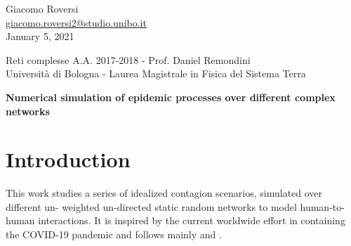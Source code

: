 \documentclass[DIV=12, BCOR=0pt]{scrartcl}  %
\begin{document}
%	
%



\begin{flushright}
	{\large Giacomo Roversi} \\ 
	{\small \href{mailto:giacomo.roversi2@studio.unibo.it}{giacomo.roversi2@studio.unibo.it} }\\
	\vskip0.15in
	{\large January 5, 2021}
\end{flushright}

\begin{flushleft}
	{\Large \color{gray}
		Reti complesse A.A. 2017-2018 - Prof. Daniel Remondini  \\
		Università di Bologna - Laurea Magistrale in Fisica del Sistema Terra}


	\vskip0.2in
	{\huge\textbf{Numerical simulation of epidemic processes over different complex networks}} 
	\vskip0.33in
	
\end{flushleft}
	
	\section*{Introduction}
	\label{sec:intro}
	This work studies a series of idealized contagion scenarios, simulated over different un- weighted un-directed static random networks to model human-to-human interactions. It is inspired by the current worldwide effort in containing the COVID-19 pandemic and follows mainly \citet{PastorSatorras} and \citet{Firth2020}.
	
\end{document}
